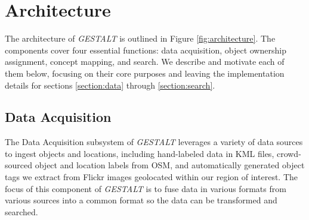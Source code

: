 \section{Architecture}
\label{section:architecture}

\begin{figure*}[t]
    
    \centering
    \caption[width=\textwidth]{The architecture of \emph{GESTALT} consists of the data collection subsystem, the ownership assignment process, the concept mapping process and the search subsystem.}
    \label{fig:architecture}
\end{figure*}

The architecture of \textit{GESTALT} is outlined in Figure \ref{fig:architecture}. The components cover four essential functions: data acquisition, object ownership assignment, concept mapping, and search. 
We describe and motivate each of them below, focusing on their core purposes and leaving the implementation details for sections \ref{section:data} through \ref{section:search}. 

\subsection{Data Acquisition}
The Data Acquisition subsystem of \emph{GESTALT} leverages a variety of data sources to ingest objects and locations, including hand-labeled data in KML files, crowd-sourced object and location labels from OSM, and automatically generated object tags we extract from Flickr images geolocated within our region of interest. 
The focus of this component of \emph{GESTALT} is to fuse data in various formats from various sources into a common format so the data can be transformed and searched.

